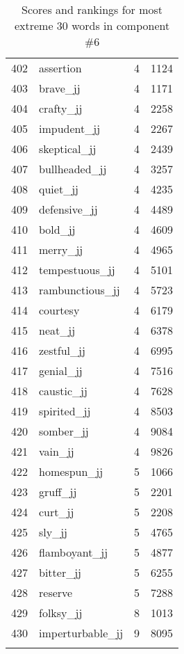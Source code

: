 \begin{longtable}[!htbp]{| rlr@{.}l |}
    402 & assertion & 4 & 1124 \\
    403 & brave\_jj & 4 & 1171 \\
    404 & crafty\_jj & 4 & 2258 \\
    405 & impudent\_jj & 4 & 2267 \\
    406 & skeptical\_jj & 4 & 2439 \\
    407 & bullheaded\_jj & 4 & 3257 \\
    408 & quiet\_jj & 4 & 4235 \\
    409 & defensive\_jj & 4 & 4489 \\
    410 & bold\_jj & 4 & 4609 \\
    411 & merry\_jj & 4 & 4965 \\
    412 & tempestuous\_jj & 4 & 5101 \\
    413 & rambunctious\_jj & 4 & 5723 \\
    414 & courtesy & 4 & 6179 \\
    415 & neat\_jj & 4 & 6378 \\
    416 & zestful\_jj & 4 & 6995 \\
    417 & genial\_jj & 4 & 7516 \\
    418 & caustic\_jj & 4 & 7628 \\
    419 & spirited\_jj & 4 & 8503 \\
    420 & somber\_jj & 4 & 9084 \\
    421 & vain\_jj & 4 & 9826 \\
    422 & homespun\_jj & 5 & 1066 \\
    423 & gruff\_jj & 5 & 2201 \\
    424 & curt\_jj & 5 & 2208 \\
    425 & sly\_jj & 5 & 4765 \\
    426 & flamboyant\_jj & 5 & 4877 \\
    427 & bitter\_jj & 5 & 6255 \\
    428 & reserve & 5 & 7288 \\
    429 & folksy\_jj & 8 & 1013 \\
    430 & imperturbable\_jj & 9 & 8095 \\
    \hline
    \caption{Scores and rankings for most extreme 30 words in component \#6} \\
\end{longtable}
